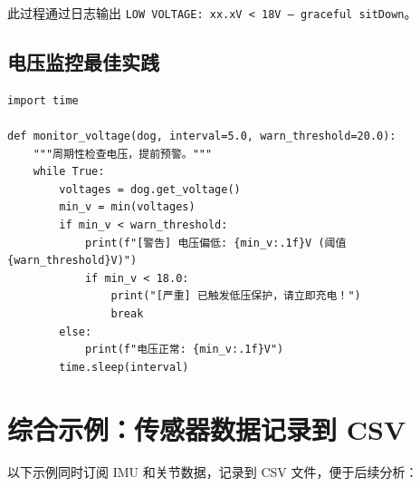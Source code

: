 \documentclass[a4paper,11pt,openany]{book}
\begin{document}
此过程通过日志输出 \texttt{LOW VOLTAGE: xx.xV < 18V -- graceful sitDown}。

\subsection{电压监控最佳实践}

\begin{lstlisting}[style=python]
import time

def monitor_voltage(dog, interval=5.0, warn_threshold=20.0):
    """周期性检查电压，提前预警。"""
    while True:
        voltages = dog.get_voltage()
        min_v = min(voltages)
        if min_v < warn_threshold:
            print(f"[警告] 电压偏低: {min_v:.1f}V (阈值 {warn_threshold}V)")
            if min_v < 18.0:
                print("[严重] 已触发低压保护，请立即充电！")
                break
        else:
            print(f"电压正常: {min_v:.1f}V")
        time.sleep(interval)
\end{lstlisting}

\section{综合示例：传感器数据记录到 CSV}

以下示例同时订阅 IMU 和关节数据，记录到 CSV 文件，便于后续分析：
\end{document}
